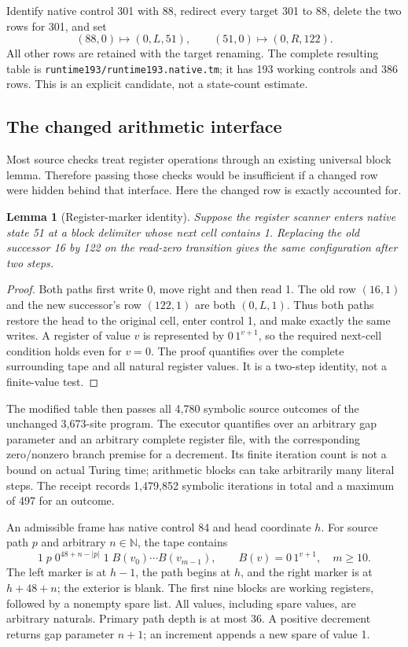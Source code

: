 \documentclass[11pt,letterpaper]{article}
\newcommand{\file}[1]{\texttt{\nolinkurl{#1}}}
\newtheorem{lemma}[theorem]{Lemma}
\begin{document}
Identify native control 301 with 88, redirect every target 301 to 88,
delete the two rows for 301, and set
\[
 (88,0)\mapsto(0,L,51),\qquad
 (51,0)\mapsto(0,R,122).
\]
All other rows are retained with the target renaming. The complete resulting
table is \file{runtime193/runtime193.native.tm}; it has 193 working controls
and 386 rows. This is an explicit candidate, not a state-count estimate.

\subsection{The changed arithmetic interface}

Most source checks treat register operations through an existing universal
block lemma. Therefore passing those checks would be insufficient if a
changed row were hidden behind that interface. Here the changed row is
exactly accounted for.

\begin{lemma}[Register-marker identity]\label{lem:marker}
Suppose the register scanner enters native state 51 at a block delimiter
whose next cell contains 1. Replacing the old successor 16 by 122 on the
read-zero transition gives the same configuration after two steps.
\end{lemma}
\begin{proof}
Both paths first write 0, move right and then read 1. The old row
$(16,1)$ and the new successor's row $(122,1)$ are both $(0,L,1)$.
Thus both paths restore the head to the original cell, enter control 1,
and make exactly the same writes. A register of value $v$ is represented
by $0\,1^{v+1}$, so the required next-cell condition holds even for $v=0$.
The proof quantifies over the complete surrounding tape and all natural
register values. It is a two-step identity, not a finite-value test.
\end{proof}

The modified table then passes all 4,780 symbolic source outcomes of the
unchanged 3,673-site program. The executor quantifies over an arbitrary gap
parameter and an arbitrary complete register file, with the corresponding
zero/nonzero branch premise for a decrement. Its finite iteration count is
not a bound on actual Turing time; arithmetic blocks can take arbitrarily
many literal steps. The receipt records 1,479,852 symbolic iterations in
total and a maximum of 497 for an outcome.

An admissible frame has native control 84 and head coordinate $h$.
For source path $p$ and arbitrary $n\in\mathbb N$, the tape contains
\[
  1\;p\;0^{48+n-|p|}\;1\;B(v_0)\cdots B(v_{m-1}),
  \qquad B(v)=0\,1^{v+1},\quad m\ge10.
\]
The left marker is at $h-1$, the path begins at $h$, and the right marker
is at $h+48+n$; the exterior is blank. The first nine blocks are working
registers, followed by a nonempty spare list. All values, including spare
values, are arbitrary naturals. Primary path depth is at most 36. A positive
decrement returns gap parameter $n+1$; an increment appends a new spare
of value 1.
\end{document}
